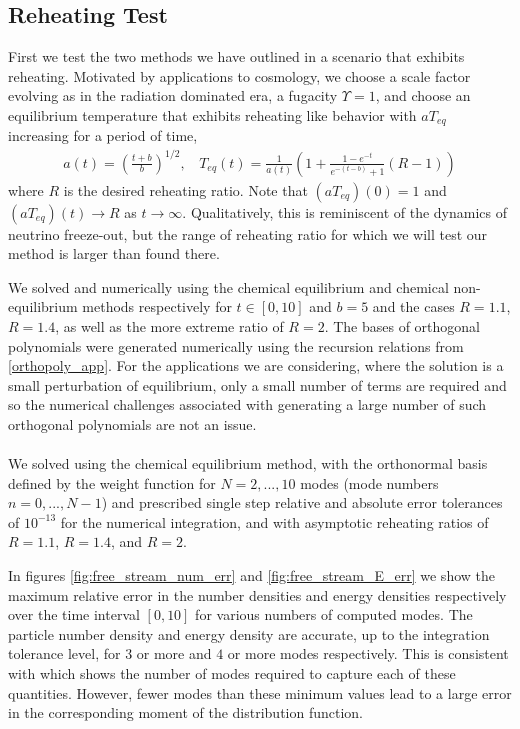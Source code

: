 \subsection{Reheating Test}
First we test the two methods we have outlined in a scenario that exhibits reheating.  Motivated by applications to cosmology, we choose a scale factor evolving as in the radiation dominated era, a fugacity $\Upsilon=1$, and choose an equilibrium temperature that exhibits reheating like behavior with $aT_{eq}$ increasing for a period of time,
\begin{align}\label{a_T_def}
a(t)=\left(\frac{t+b}{b}\right)^{1/2}\!\!\!,\ \  \ \
T_{eq}(t)=\frac{1}{a(t)}\left(1+\frac{1-e^{-t}}{e^{-(t-b)}+1}(R-1)\right)
\end{align}
where $R$ is the desired reheating ratio. Note that $(aT_{eq})(0)=1$ and $(aT_{eq})(t)\rightarrow R$ as $t\rightarrow\infty$. Qualitatively, this is reminiscent of the dynamics of neutrino freeze-out, but the range of reheating ratio for which we will test our method is larger than found there.

We solved  and  numerically using the chemical equilibrium and chemical non-equilibrium methods respectively for $t\in[0,10]$ and $b=5$ and the cases $R=1.1$, $R=1.4$, as well as the more extreme ratio of $R=2$.  The bases of orthogonal polynomials were generated numerically using the recursion relations from \ref{orthopoly_app}.  For the applications we are considering, where the solution is a small perturbation of equilibrium, only a small number of terms are required and so the numerical challenges associated with generating a large number of such orthogonal polynomials are not an issue.\\

\\
We solved  using the chemical equilibrium method, with the orthonormal basis defined by the weight function  for $N=2,...,10$ modes (mode numbers $n=0,...,N-1$) and prescribed  single step relative and absolute error tolerances of $10^{-13}$ for the numerical integration, and with asymptotic reheating ratios of $R=1.1$, $R=1.4$, and $R=2$.   



In figures   \ref{fig:free_stream_num_err} and  \ref{fig:free_stream_E_err} we show the maximum relative error in the number densities and energy densities respectively over the time interval $[0,10]$ for various numbers of computed modes.  The particle number density and energy density are accurate, up to the integration tolerance level, for $3$ or more and $4$ or more modes respectively. This is consistent with  which shows the number of modes required to capture each of these quantities. However, fewer modes than these minimum values lead to a large error in the corresponding moment of the distribution function.


